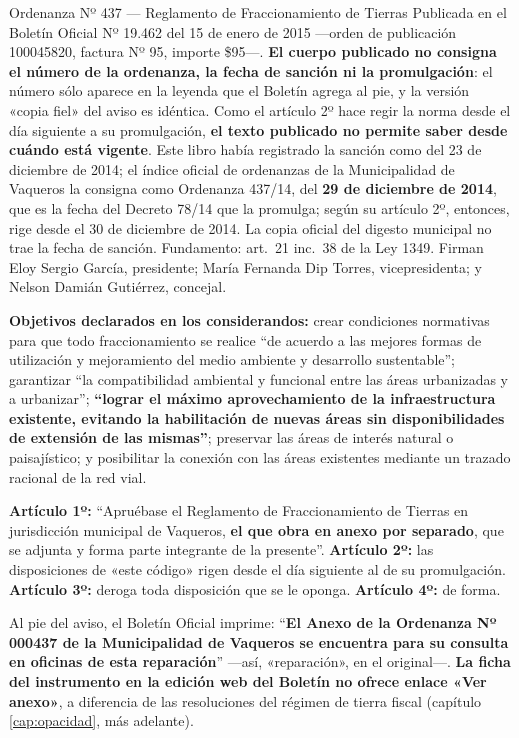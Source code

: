 \begin{ficha}{Ordenanza Nº 437 --- Reglamento de Fraccionamiento de Tierras}
Publicada en el Boletín Oficial Nº 19.462 del 15 de enero de 2015 ---orden de publicación 100045820, factura Nº 95, importe \$95---. \textbf{El cuerpo publicado no consigna el número de la ordenanza, la fecha de sanción ni la promulgación}: el número sólo aparece en la leyenda que el Boletín agrega al pie, y la versión «copia fiel» del aviso es idéntica. Como el artículo 2º hace regir la norma desde el día siguiente a su promulgación, \textbf{el texto publicado no permite saber desde cuándo está vigente}. Este libro había registrado la sanción como del 23 de diciembre de 2014; el índice oficial de ordenanzas de la Municipalidad de Vaqueros la consigna como Ordenanza 437/14, del \textbf{29 de diciembre de 2014}, que es la fecha del Decreto 78/14 que la promulga; según su artículo 2º, entonces, rige desde el 30 de diciembre de 2014. La copia oficial del digesto municipal no trae la fecha de sanción. Fundamento: art.\ 21 inc.\ 38 de la Ley 1349. Firman Eloy Sergio García, presidente; María Fernanda Dip Torres, vicepresidenta; y Nelson Damián Gutiérrez, concejal.

\textbf{Objetivos declarados en los considerandos:} crear condiciones normativas para que todo fraccionamiento se realice ``de acuerdo a las mejores formas de utilización y mejoramiento del medio ambiente y desarrollo sustentable''; garantizar ``la compatibilidad ambiental y funcional entre las áreas urbanizadas y a urbanizar''; \textbf{``lograr el máximo aprovechamiento de la infraestructura existente, evitando la habilitación de nuevas áreas sin disponibilidades de extensión de las mismas''}; preservar las áreas de interés natural o paisajístico; y posibilitar la conexión con las áreas existentes mediante un trazado racional de la red vial.

\textbf{Artículo 1º:} ``Apruébase el Reglamento de Fraccionamiento de Tierras en jurisdicción municipal de Vaqueros, \textbf{el que obra en anexo por separado}, que se adjunta y forma parte integrante de la presente''. \textbf{Artículo 2º:} las disposiciones de «este código» rigen desde el día siguiente al de su promulgación. \textbf{Artículo 3º:} deroga toda disposición que se le oponga. \textbf{Artículo 4º:} de forma.

Al pie del aviso, el Boletín Oficial imprime: ``\textbf{El Anexo de la Ordenanza Nº 000437 de la Municipalidad de Vaqueros se encuentra para su consulta en oficinas de esta reparación}'' ---así, «reparación», en el original---. \textbf{La ficha del instrumento en la edición web del Boletín no ofrece enlace «Ver anexo»}, a diferencia de las resoluciones del régimen de tierra fiscal (capítulo \ref{cap:opacidad}, más adelante).
\end{ficha}

